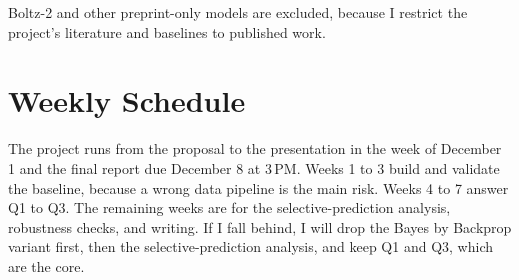 \documentclass[10pt,twocolumn]{article}
\begin{document}
Boltz-2 and other preprint-only models are excluded, because I restrict the project's literature and baselines to published work.

\section{Weekly Schedule}

The project runs from the proposal to the presentation in the week of December 1 and the final report due December 8 at 3\,PM. Weeks 1 to 3 build and validate the baseline, because a wrong data pipeline is the main risk. Weeks 4 to 7 answer Q1 to Q3. The remaining weeks are for the selective-prediction analysis, robustness checks, and writing. If I fall behind, I will drop the Bayes by Backprop variant first, then the selective-prediction analysis, and keep Q1 and Q3, which are the core.
\end{document}

